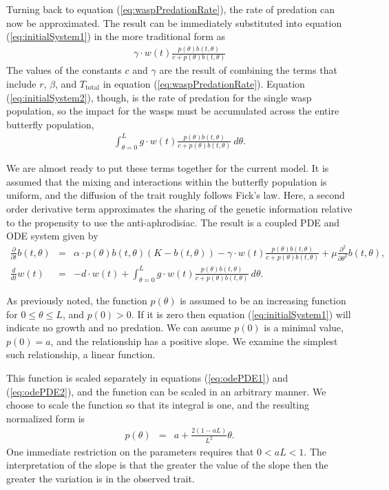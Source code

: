 \documentclass[12pt]{article}
\begin{document}
Turning back to equation (\ref{eq:waspPredationRate}), the rate of
predation can now be approximated.  The result can be immediately
substituted into equation (\ref{eq:initialSystem1}) in the more
traditional form as
\begin{eqnarray}
  \label{eq:butterflyPredationRate}
  \gamma \cdot w(t) \frac{p(\theta) b(t,\theta) }{c +  p(\theta) b(t,\theta)}
\end{eqnarray}
The values of the constants $c$ and $\gamma$ are the result of
combining the terms that include $r$, $\beta$, and $T_\mathrm{total}$
in equation (\ref{eq:waspPredationRate}).  Equation
(\ref{eq:initialSystem2}), though, is the rate of predation for the
single wasp population, so the impact for the wasps must be
accumulated across the entire butterfly population,
\begin{eqnarray}
  \label{eq:totalWaspPredationRate}
  \int^L_{\theta=0} g \cdot w(t) \frac{p(\theta) b(t,\theta) }{c + p(\theta) b(t,\theta)} ~ d\theta.
\end{eqnarray}

We are almost ready to put these terms together for the current
model. It is assumed that the mixing and interactions within the
butterfly population is uniform, and the diffusion of the trait
roughly follows Fick's law\cite{logan2006applied}. Here, a second
order derivative term approximates the sharing of the genetic
information relative to the propensity to use the
anti-aphrodisiac. The result is a coupled PDE and ODE system given by
\begin{eqnarray}
  \label{eq:odePDE1}
  \frac{\partial}{\partial t} b(t,\theta) & = &
      \alpha \cdot p(\theta) b(t,\theta) (K - b(t,\theta))
      - \gamma \cdot w(t) \frac{p(\theta) b(t,\theta)}{c+p(\theta)b(t,\theta)}
      + \mu \frac{\partial^2}{\partial \theta^2} b(t,\theta) , \\
  \label{eq:odePDE2}
  \frac{d}{dt} w(t) & = & -d \cdot w(t) +
      \int^L_{\theta=0} g \cdot w(t) \frac{p(\theta) b(t,\theta) }{c + p(\theta) b(t,\theta)} ~ d\theta.
\end{eqnarray}

As previously noted, the function $p(\theta)$ is assumed to be an
increasing function for $0\leq\theta\leq L$, and $p(0)>0$. If it is
zero then equation (\ref{eq:initialSystem1}) will indicate no growth
and no predation. We can assume $p(0)$ is a minimal value, $p(0)=a$,
and the relationship has a positive slope. We examine the simplest
such relationship, a linear function.

This function is scaled separately in equations (\ref{eq:odePDE1}) and
(\ref{eq:odePDE2}), and the function can be scaled in an arbitrary
manner. We choose to scale the function so that its integral is one,
and the resulting normalized form is
\begin{eqnarray}
  \label{eq:linearFormP}
  p(\theta) & = & a + \frac{2(1-aL)}{L^2} \theta.
\end{eqnarray}
One immediate restriction on the parameters requires that
$0<aL<1$. The interpretation of the slope is that the greater the
value of the slope then the greater the variation is in the observed
trait.
\end{document}
